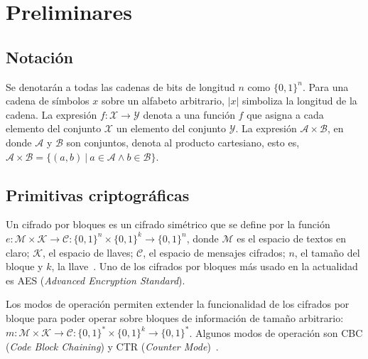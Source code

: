 %
%

\section{Preliminares}
\label{sec:preliminares}

\subsection{Notación}

Se denotarán a todas las cadenas de bits de longitud $ n $ como $ \{ 0, 1 \}^n $.
Para una cadena de símbolos $ x $ sobre un alfabeto arbitrario, $ | x | $
simboliza la longitud de la cadena. La expresión $ f: \mathcal{X} \rightarrow
\mathcal{Y} $ denota a una función $ f $ que asigna a cada elemento del conjunto
$ \mathcal{X} $ un elemento del conjunto $ \mathcal{Y} $. La expresión $
\mathcal{A} \times \mathcal{B} $, en donde $ \mathcal{A} $ y $ \mathcal{B} $ son
conjuntos, denota al producto cartesiano, esto es, $ \mathcal{A} \times
\mathcal{B} = \{ (a,b) \ | \ a \in \mathcal{A} \land b \in \mathcal{B} \} $.

\subsection{Primitivas criptográficas}

Un cifrado por bloques es un cifrado simétrico que se define por la función $ e:
\mathcal{M} \times \mathcal{K} \rightarrow \mathcal{C} : \{ 0, 1 \}^n \times \{
0, 1 \}^k \rightarrow \{ 0, 1 \}^n $, donde $ \mathcal{M} $ es el espacio de
textos en claro; $ \mathcal{K} $, el espacio de llaves; $ \mathcal{C} $, el
espacio de mensajes cifrados; $ n $, el tamaño del bloque y $ k $, la
llave~\cite{menezes}. Uno de los cifrados por bloques más usado en la actualidad
es AES (\textit{Advanced Encryption Standard}).

Los modos de operación permiten extender la funcionalidad de los cifrados por
bloque para poder operar sobre bloques de información de tamaño arbitrario: $ m:
\mathcal{M} \times \mathcal{K} \rightarrow \mathcal{C} : \{ 0, 1 \}^* \times \{
0, 1 \}^k \rightarrow \{ 0, 1 \}^* $. Algunos modos de operación son CBC
(\textit{Code Block Chaining}) y CTR (\textit{Counter
Mode})~\cite{modos_de_operacion}.


